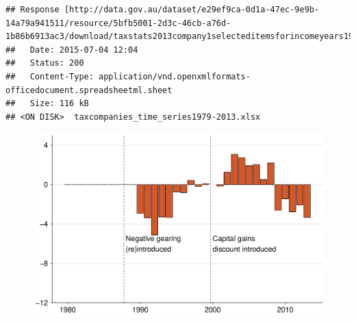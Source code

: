 \documentclass{grattan}\usepackage[]{graphicx}\usepackage[]{color}
\makeatletter
\newenvironment{kframe}{%
 \def\at@end@of@kframe{}%
 \ifinner\ifhmode%
  \def\at@end@of@kframe{\end{minipage}}%
  \begin{minipage}{\columnwidth}%
 \fi\fi%
 \def\FrameCommand##1{\hskip\@totalleftmargin \hskip-\fboxsep
 \colorbox{shadecolor}{##1}\hskip-\fboxsep
     \hskip-\linewidth \hskip-\@totalleftmargin \hskip\columnwidth}%
 \MakeFramed {\advance\hsize-\width
   \@totalleftmargin\z@ \linewidth\hsize
   \@setminipage}}%
 {\par\unskip\endMakeFramed%
 \at@end@of@kframe}
\newenvironment{knitrout}{}{} %
\makeatother
\begin{document}
\begin{knitrout}
\color{fgcolor}\begin{kframe}
\begin{verbatim}
## Response [http://data.gov.au/dataset/e29ef9ca-0d1a-47ec-9e9b-14a79a941511/resource/5bfb5001-2d3c-46cb-a76d-1b86b6913ac3/download/taxstats2013company1selecteditemsforincomeyears197980to201213.xlsx]
##   Date: 2015-07-04 12:04
##   Status: 200
##   Content-Type: application/vnd.openxmlformats-officedocument.spreadsheetml.sheet
##   Size: 116 kB
## <ON DISK>  taxcompanies_time_series1979-2013.xlsx
\end{verbatim}
\end{kframe}
\end{knitrout}


\begin{figure}[t]
\includegraphics[width=\columnwidth]{figure/Net_rent_over_time_companies-1}
\end{figure}
\end{document}
